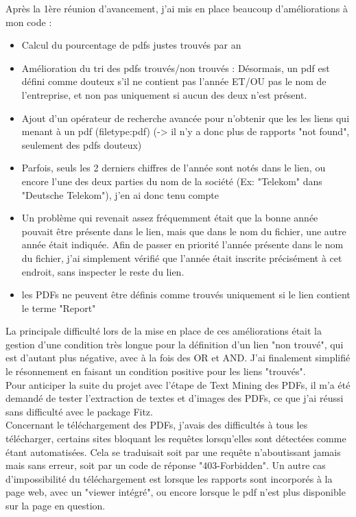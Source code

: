 Après la 1ère réunion d'avancement, j'ai mis en place beaucoup d'améliorations à mon code :
\begin{itemize}
    \item Calcul du pourcentage de pdfs justes trouvés par an
    \item Amélioration du tri des pdfs trouvés/non trouvés : Désormais, un pdf est défini comme douteux s'il ne contient pas l'année ET/OU pas le nom de l'entreprise, et non pas uniquement si aucun des deux n'est présent.
    \item Ajout d'un opérateur de recherche avancée pour n'obtenir que les les liens qui menant à un pdf (filetype:pdf) (-> il n'y a donc plus de rapports "not found", seulement des pdfs douteux)
    \item Parfois, seuls les 2 derniers chiffres de l'année sont notés dans le lien, ou encore l'une des deux parties du nom de la société (Ex: "Telekom" dans "Deutsche Telekom"), j'en ai donc tenu compte
    \item Un problème qui revenait assez fréquemment était que la bonne année pouvait être présente dans le lien, mais que dans le nom du fichier, une autre année était indiquée. Afin de passer en priorité l'année présente dans le nom du fichier, j'ai simplement vérifié que l'année était inscrite précisément à cet endroit, sans inspecter le reste du lien.
    \item les PDFs ne peuvent être définis comme trouvés uniquement si le lien contient le terme "Report"
\end{itemize}

La principale difficulté lors de la mise en place de ces améliorations était la gestion d'une condition très longue pour la définition d'un lien "non trouvé", qui est d'autant plus négative, avec à la fois des OR et AND.
J'ai finalement simplifié le résonnement en faisant un condition positive pour les liens "trouvés".
\\

Pour anticiper la suite du projet avec l'étape de Text Mining des PDFs, il m'a été demandé de tester l'extraction de textes et d'images des PDFs, ce que j'ai réussi sans difficulté avec le package Fitz.
\\

Concernant le téléchargement des PDFs, j'avais des difficultés à tous les télécharger, certains sites bloquant les requêtes lorsqu'elles sont détectées comme étant automatisées.
Cela se traduisait soit par une requête n'aboutissant jamais mais sans erreur, soit par un code de réponse "403-Forbidden".
Un autre cas d'impossibilité du téléchargement est lorsque les rapports sont incorporés à la page web, avec un "viewer intégré", ou encore lorsque le pdf n'est plus disponible sur la page en question.

